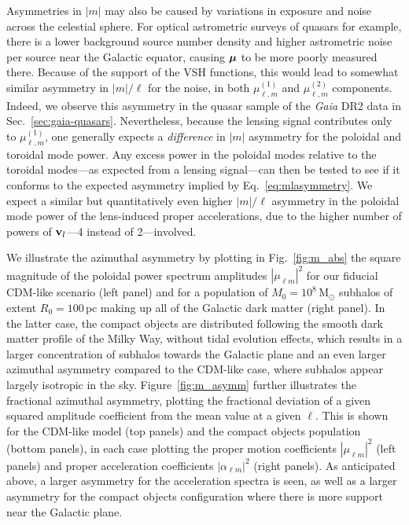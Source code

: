 \documentclass[prd,aps,twocolumn,nofootinbib,superscriptaddress,preprintnumbers,balancelastpage,longbibliography,floatfix]{revtex4-1}
\begin{document}
Asymmetries in $|m|$ may also be caused by variations in exposure and noise across the celestial sphere. For optical astrometric surveys of quasars for example, there is a lower background source number density and higher astrometric noise per source near the Galactic equator, causing $\boldsymbol{\mathbf{\mu}}$ to be more poorly measured there. Because of the support of the VSH functions, this would lead to somewhat similar asymmetry in $|m|/\ell$ for the noise, in both $\mu_{\ell,m}^{(1)}$ and $\mu_{\ell,m}^{(2)}$ components. Indeed, we observe this asymmetry in the quasar sample of the \textit{Gaia} DR2 data in Sec.~\ref{sec:gaia-quasars}. Nevertheless, because the lensing signal contributes only to $\mu_{\ell,m}^{(1)}$, one generally expects a \emph{difference} in $|m|$ asymmetry for the poloidal and toroidal mode power. Any excess power in the poloidal modes relative to the toroidal modes---as expected from a lensing signal---can then be tested to see if it conforms to the expected asymmetry implied by Eq.~\eqref{eq:mlasymmetry}. We expect a similar but quantitatively even higher $|m|/\ell$ asymmetry in the poloidal mode power of the lens-induced proper accelerations, due to the higher number of powers of $\boldsymbol{\mathbf{v}}_l$---4 instead of 2---involved.

We illustrate the azimuthal asymmetry by plotting in Fig.~\ref{fig:m_abs} the square magnitude of the poloidal power spectrum amplitudes $|\mu_{\ell m}|^2$ for our fiducial CDM-like scenario (left panel) and for a population of $M_0 = 10^8\,\mathrm M_\odot$ subhalos of extent $R_0 = 100\,\mathrm{pc}$ making up all of the Galactic dark matter (right panel). In the latter case, the compact objects are distributed following the smooth dark matter profile of the Milky Way, without tidal evolution effects, which results in a larger concentration of subhalos towards the Galactic plane and an even larger azimuthal asymmetry compared to the CDM-like case, where subhalos appear largely isotropic in the sky. Figure~\ref{fig:m_asymm} further illustrates the fractional azimuthal asymmetry, plotting the fractional deviation of a given squared amplitude coefficient from the mean value at a given $\ell$. This is shown for the CDM-like model (top panels) and the compact objects population (bottom panels), in each case plotting the proper motion coefficients $|\mu_{\ell m}|^2$ (left panels) and proper acceleration coefficients $|\alpha_{\ell m}|^2$ (right panels). As anticipated above, a larger asymmetry for the acceleration spectra is seen, as well as a larger asymmetry for the compact objects configuration where there is more support near the Galactic plane. 
\end{document}

